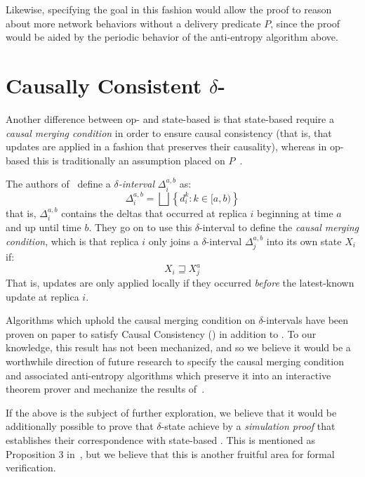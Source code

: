 Likewise, specifying the goal in this fashion would allow the proof to reason
about more network behaviors without a delivery predicate $P$, since the proof
would be aided by the periodic behavior of the anti-entropy algorithm above.

\section{Causally Consistent $\delta$-\CRDTs}

Another difference between op- and state-based \CRDTs is that state-based \CRDTs
require a \emph{causal merging condition} in order to ensure causal consistency
(that is, that updates are applied in a fashion that preserves their causality),
whereas in op-based \CRDTs this is traditionally an assumption placed on
$P$~\citep{shapiro11}.

The authors of~\citet{almedia18} define a \emph{$\delta$-interval}
$\Delta^{a,b}_i$ as:
\[
  \Delta^{a,b}_i = \bigsqcup \left\{ d_i^k : k \in [a, b) \right\}
\]
that is, $\Delta^{a,b}_i$ contains the deltas that occurred at replica $i$
beginning at time $a$ and up until time $b$. They go on to use this
$\delta$-interval to define the \emph{causal merging condition}, which is that
replica $i$ only joins a $\delta$-interval $\Delta^{a,b}_j$ into its own state
$X_i$ if:
\[
  X_i \sqsupseteq X_j^a
\]
That is, updates are only applied locally if they occurred \emph{before} the
latest-known update at replica $i$.

Algorithms which uphold the causal merging condition on $\delta$-intervals have
been proven on paper to satisfy Causal Consistency (\CC) in addition to \SEC. To
our knowledge, this result has not been mechanized, and so we believe it would
be a worthwhile direction of future research to specify the causal merging
condition and associated anti-entropy algorithms which preserve it into an
interactive theorem prover and mechanize the results of~\citet{almedia18}.

If the above is the subject of further exploration, we believe that it would be
additionally possible to prove that $\delta$-state \CRDTs achieve \SEC by a
\emph{simulation proof} that establishes their correspondence with state-based
\CRDTs. This is mentioned as Proposition 3 in~\citet{almedia18}, but we believe
that this is another fruitful area for formal verification.

